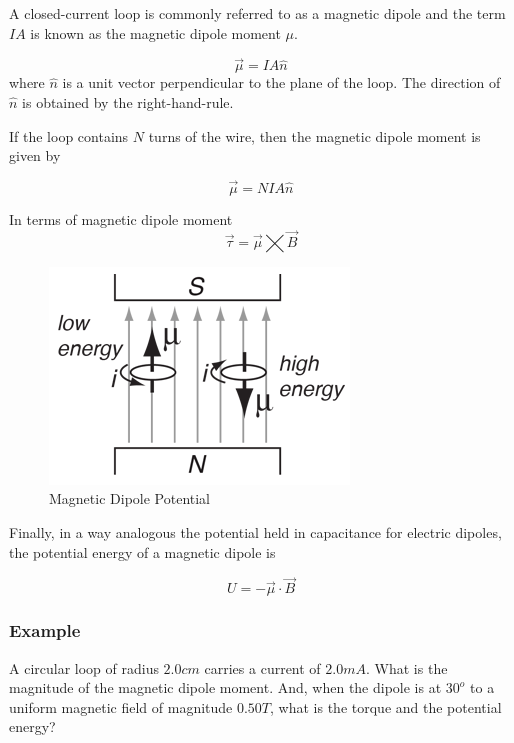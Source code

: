 \documentclass[14pt]{memoir}
\begin{document}
A closed-current loop is commonly referred to as a magnetic dipole and the term $IA$ is known as the magnetic dipole moment $\mu$.

\begin{equation}
\vec{\mu} = IA \hat{n}
\end{equation}
where $\hat{n}$ is a unit vector perpendicular to the plane of the loop. The direction of $\hat{n}$ is obtained by the right-hand-rule. 

If the loop contains $N$ turns of the wire, then the magnetic dipole moment is given by

\begin{equation}
\vec{\mu} = NIA \hat{n}
\end{equation}

In terms of magnetic dipole moment
\begin{equation}
\vec{\tau} = \vec{\mu} \bigtimes \vec{B}
\end{equation}

\begin{figure}[H]
\begin{center}
\includegraphics[scale=2.0]{fig/magdip.png}
\caption{Magnetic Dipole Potential}
\label{fig:magdip}
\end{center}
\end{figure}

Finally, in a way analogous the potential held in capacitance for electric dipoles, the potential energy of a magnetic dipole is 

\begin{equation}
U = - \vec{\mu} \cdot \vec{B}
\end{equation}

\subsubsection{Example}

A circular loop of radius $2.0cm$ carries a current of $2.0mA$. What is the magnitude of the magnetic dipole moment. And, when the dipole is at $30^o$ to a uniform magnetic field of magnitude $0.50T$, what is the torque and the potential energy?
\end{document}
